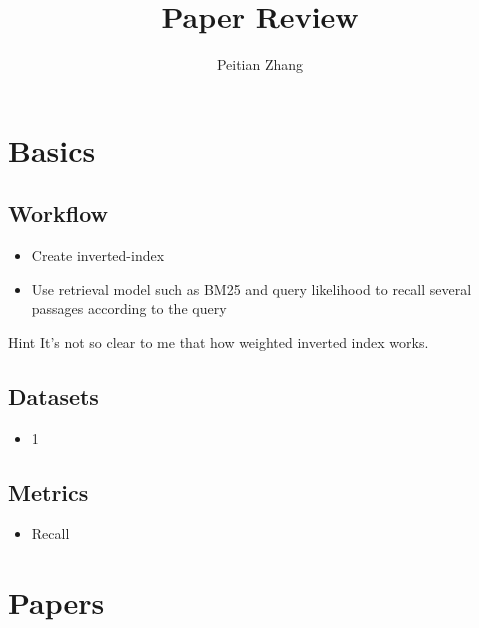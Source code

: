 \documentclass{beamer}
\title{Paper Review}
\author{Peitian Zhang}
\institute[RUC]{Renmin University of China}
\institute[MSRA]{Microsoft Research Asia}
\begin{document}
\begin{frame}
    \titlepage
\end{frame}

\begin{frame}
    \tableofcontents
\end{frame}

\section{Basics}
\subsection{Workflow}
\begin{frame}
    \begin{itemize}
        \item Create inverted-index
        \item Use retrieval model such as BM25 and query likelihood to recall several passages according to the query
    \end{itemize}
    \begin{block}{Hint}
        It's not so clear to me that how weighted inverted index works.
    \end{block}
\end{frame}
\subsection{Datasets}
\begin{frame}
    \begin{itemize}
        \item 1
    \end{itemize}
\end{frame}
\subsection{Metrics}
\begin{frame}
    \begin{itemize}
        \item Recall
    \end{itemize}
\end{frame}

\section{Papers}
\end{document}

